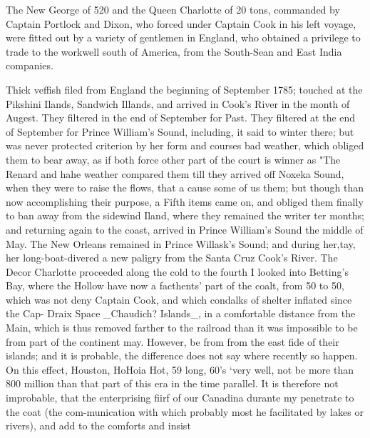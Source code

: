 The New George of 520 and the Queen Charlotte of 20 tons, commanded by Captain Portlock and Dixon, who forced under Captain Cook in his left voyage, were fitted out by a variety of gentlemen in England, who obtained a privilege to trade to the workwell south of America, from the South-Sean and East India companies.\par\medskip
Thick veffish filed from England the beginning of September 1785; touched at the Pikshini Ilands, Sandwich Illands, and arrived in Cook's River in the month of Augest. They filtered in the end of September for Past. They filtered at the end of September for Prince William's Sound, including, it said to winter there; but was never protected criterion by her form and courses bad weather, which obliged them to bear away, as if both force other part of the court is winner as "The Renard and hahe weather compared them till they arrived off Noxeka Sound, when they were to raise the flows, that a cause some of us them; but though than now accomplishing their purpose, a Fifth items came on, and obliged them finally to ban away from the sidewind Iland, where they remained the writer ter months; and returning again to the coast, arrived in Prince William's Sound the middle of May. The New Orleans remained in Prince Willask's Sound; and during her,tay, her long-boat-divered a new paligry from the Santa Cruz Cook's River. The Decor Charlotte proceeded along the cold to the fourth I looked into Betting's Bay, where the Hollow have now a facthents' part of the coalt, from 50 to 50, which was not deny Captain Cook, and which condalks of shelter inflated since the Cap- Draix Space \_Chaudich? Islands\_, in a comfortable distance from the Main, which is thus removed farther to the railroad than it was impossible to be from part of the continent may. However, be from from the east fide of their islands; and it is probable, the difference does not say where recently so happen. On this effect, Houston, HoHoia Hot, 59 long, 60’s ‘very well, not be more than 800 million than that part of this era in the time parallel. It is therefore not improbable, that the enterprising fiirf of our Canadina durante my penetrate to the coat (the com-munication with which probably most he facilitated by lakes or rivers), and add to the comforts and insist\par\medskip
